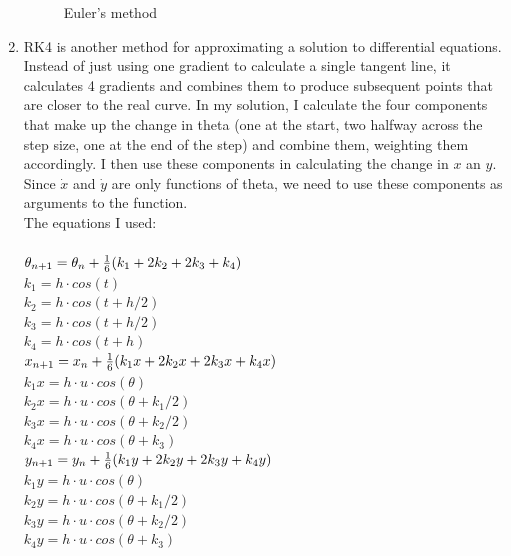\documentclass[12pt,a4paper]{article}
\begin{document}
\begin{enumerate}[label=(\alph*)]
\begin{figure}[h]
	      	\caption{Euler's method}
	      	\label{fig:euler}
	      \end{figure}
	\item RK4 is another method for approximating a solution to differential equations. Instead of just using one gradient to calculate a single tangent line, it calculates 4 gradients and combines them to produce subsequent points that are closer to the real curve. In my solution, I calculate the four components that make up the change in theta (one at the start, two halfway across the step size, one at the end of the step) and combine them, weighting them accordingly. I then use these components in calculating the change in $x$ an $y$. Since $\dot{x}$ and $\dot{y}$ are only functions of theta, we need to use these components as arguments to the function.\\
	The equations I used:\\ \\
		  $ \theta_{n+1} = \theta_n + {1\over{6}} (k_1 + 2k_2 + 2k_3 + k_4) $\\
		$k_1 = h\cdot cos(t)$\\
		$k_2 = h\cdot cos(t+h/2)$\\
		$k_3 = h\cdot cos(t+h/2)$\\
		$k_4 = h\cdot cos(t+h)$\\

		$ x_{n+1} = x_n + {1\over{6}} (k_1x + 2k_2x + 2k_3x + k_4x) $\\
		$k_1x = h \cdot u \cdot cos(\theta)$\\
		$k_2x = h \cdot u \cdot cos(\theta+k_1/2)$\\
		$k_3x = h \cdot u \cdot cos(\theta+k_2/2)$\\
		$k_4x = h \cdot u \cdot cos(\theta+k_3)$\\
		
		$ y_{n+1} = y_n + {1\over{6}} (k_1y + 2k_2y + 2k_3y + k_4y) $\\
		$k_1y = h \cdot u \cdot cos(\theta)$\\
		$k_2y = h \cdot u \cdot cos(\theta+k_1/2)$\\
		$k_3y = h \cdot u \cdot cos(\theta+k_2/2)$\\
		$k_4y = h \cdot u \cdot cos(\theta+k_3)$\\
		

\end{enumerate}
\end{document}
